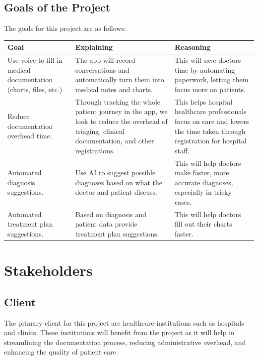 \documentclass[12pt]{article}
\begin{document}
\subsection{Goals of the Project}

The goals for this project are as follows:

\begin{table}[H]
  \centering
  \begin{tabular}{p{4cm} p{4cm} p{4cm}}
      \toprule
      \textbf{Goal} & \textbf{Explaining} & \textbf{Reasoning} \\
      \midrule
      Use voice to fill in medical documentation (charts, files, etc.) & The app will record conversations and automatically turn them into medical notes and charts. & This will save doctors time by automating paperwork, letting them focus more on patients. \\
      \midrule
      Reduce documentation overhead time.  & Through tracking the whole patient journey in the app, we look to reduce the overhead of triaging, clinical documentation, and other registrations.  & This helps hospital healthcare professionals focus on care and lowers the time taken through registration for hospital staff. \\
      \midrule
      Automated diagnosis suggestions.  & Use AI to suggest possible diagnoses based on what the doctor and patient discuss.  & This will help doctors make faster, more accurate diagnoses, especially in tricky cases. \\
      \midrule
      Automated treatment plan suggestions. & Based on diagnosis and patient data provide treatment plan suggestions. & This will help doctors fill out their charts faster. \\
      \bottomrule
  \end{tabular}
\end{table}

\section{Stakeholders}

\subsection{Client}
The primary client for this project are healthcare institutions such as hospitals and clinics. These institutions will benefit from the project as it will help in streamlining the documentation process, reducing administrative overhead, and enhancing the quality of patient care.
\end{document}
